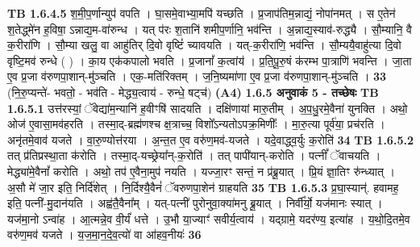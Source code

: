 \documentclass[17pt]{extarticle}
\begin{document}
                  \newline
                                \textbf{ TB 1.6.4.5} \newline
                  श॒मी॒प॒र्णान्युप॑ वपति । घा॒समे॒वाभ्या॒मपि॑ यच्छति । प्र॒जाप॑तिम॒न्नाद्यं॒ नोपा॑नमत् । स ए॒तेन॑ श॒तेद्ध्मे॑न ह॒विषा॒ ऽन्नाद्य॒म-वा॑रुन्ध । यत् प॑रः श॒तानि॑ शमीप॒र्णानि॒ भव॑न्ति । अ॒न्नाद्य॒स्याव॑-रुद्ध्यै । सौ॒म्यानि॒ वै क॒रीरा॑णि । सौ॒म्या खलु॒ वा आहु॑तिर् दि॒वो वृष्टिं॑ च्यावयति । यत्-क॒रीरा॑णि॒ भव॑न्ति । सौ॒म्ययै॒वाहु॑त्या दि॒वो वृष्टि॒मव॑ रुन्धे ( ) । का॒य एक॑कपालो भवति । प्र॒जानां᳚ क॒त्वांय॑ । प्र॒ति॒पू॒रु॒षं क॑रम्भ पा॒त्राणि॑ भवन्ति । जा॒ता ए॒व प्र॒जा व॑रुणपा॒शान्-मु॑ञ्चति । एक॒-मति॑रिक्तम् । ज॒नि॒ष्यमा॑णा ए॒व प्र॒जा व॑रुणपा॒शान्-मु॑ञ्चति । \textbf{ 33} \newline
                  \newline
                                    (नि॒रु॒प्यन्ते॑- भवतो॒ - भव॑ति - मेद्ध्य॒त्वाय॑ - रुन्धे॒ षट्च॑) \textbf{(A4)} \newline \newline
                \textbf{ 1.6.5     अनुवाकं   5 - तच्छेषः} \newline
                                \textbf{ TB 1.6.5.1} \newline
                  उत्त॑रस्यां॒ ॅवेद्या॑म॒न्यानि॑ ह॒वीꣳषि॑ सादयति । दक्षि॑णायां मारु॒तीम् । अ॒प॒धु॒रमे॒वैना॑ युनक्ति । अथो॒ ओज॑ ए॒वासा॒मव॑हरति । तस्मा॒द्-ब्रह्म॑णश्च क्ष॒त्राच्च॒ विशो᳚ऽन्यतोऽपक्र॒मिणीः᳚ । मा॒रु॒त्या पूर्व॑या॒ प्रच॑रति । अनृ॑तमे॒वाव॑ यजते । वा॒रु॒ण्योत्त॑रया । अ॒न्त॒त ए॒व वरु॑ण॒मव॑-यजते । यदे॒वाद्ध्व॒र्युः क॒रोति॑ \textbf{ 34} \newline
                  \newline
                                \textbf{ TB 1.6.5.2} \newline
                  तत् प्र॑तिप्रस्था॒ता क॑रोति । तस्मा॒द्-यच्छ्रेया᳚न्-क॒रोति॑ । तत् पापी॑यान्-करोति । पत्नीं᳚ ॅवाचयति । मेद्ध्या॑मे॒वैनां᳚ करोति । अथो॒ तप॑ ए॒वैना॒मुप॑ नयति । यज्जा॒रꣳ सन्तं॒ न प्र॑ब्रू॒यात् । प्रि॒यं ज्ञा॒तिꣳ रु॑न्ध्यात् । अ॒सौ मे॑ जा॒र इति॒ निर्दि॑शेत् । नि॒र्दिश्यै॒वैनं॑ ॅवरुणपा॒शेन॑ ग्राहयति \textbf{ 35} \newline
                  \newline
                                \textbf{ TB 1.6.5.3} \newline
                  प्र॒घा॒स्यान्॑. हवामह॒ इति॒ पत्नी॑-मु॒दान॑यति । अह्व॑तै॒वैना᳚म् । यत्-पत्नी॑ पुरोनुवा॒क्या॑मनु ब्रू॒यात् । निर्वी᳚र्यो॒ यज॑मानः स्यात् । यज॑मा॒नो ऽन्वा॑ह । आ॒त्मन्ने॒व वी॒र्यं॑ धत्ते । उ॒भौ या॒ज्याꣳ॑ सवीर्य॒त्वाय॑ । यद्ग्रामे॒ यदर॑ण्य॒ इत्या॑ह । य॒थो॒दि॒तमे॒व वरु॑ण॒मव॑ यजते । य॒ज॒मा॒न॒दे॒व॒त्यो॑ वा आ॑हव॒नीयः॑ \textbf{ 36} \newline
\end{document}

